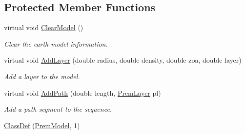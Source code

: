 \subsection*{Protected Member Functions}
\begin{DoxyCompactItemize}
\item 
virtual void \hyperlink{classOscProb_1_1PremModel_aaead53a9385bda9b0219fd051d0cdd11}{Clear\+Model} ()
\begin{DoxyCompactList}\small\item\em Clear the earth model information. \end{DoxyCompactList}\item 
virtual void \hyperlink{classOscProb_1_1PremModel_a08c337b84138adc46ee4dd002e9262d2}{Add\+Layer} (double radius, double density, double zoa, double layer)
\begin{DoxyCompactList}\small\item\em Add a layer to the model. \end{DoxyCompactList}\item 
virtual void \hyperlink{classOscProb_1_1PremModel_aca013f7ac5494282834048786a0e07a6}{Add\+Path} (double length, \hyperlink{structOscProb_1_1PremLayer}{Prem\+Layer} pl)
\begin{DoxyCompactList}\small\item\em Add a path segment to the sequence. \end{DoxyCompactList}\item 
\hyperlink{classOscProb_1_1PremModel_a9a1d78e29217bb0dd00ae3bd96d22b69}{Class\+Def} (\hyperlink{classOscProb_1_1PremModel}{Prem\+Model}, 1)
\end{DoxyCompactItemize}

